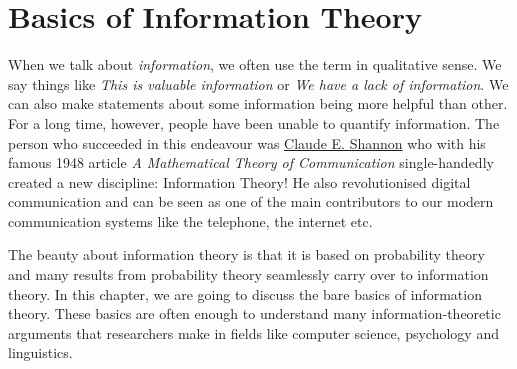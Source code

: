 \documentclass[11pt,leqno,a4paper]{report}\usepackage[]{graphicx}\usepackage[]{color}
\begin{document}


\chapter{Basics of Information Theory}

When we talk about \textit{information}, we often use the term in qualitative sense. We say things like 
\textit{This is valuable information} or 
\textit{We have a lack of information}. We can also make statements about some information being more helpful than other. For a long time, however,
people have been unable to quantify information. The person who succeeded in this endeavour was \href{https://en.wikipedia.org/wiki/Claude_Shannon}{Claude E. Shannon}
who with his famous 1948 article \textit{A Mathematical Theory of Communication} single-handedly created a new discipline: Information Theory! He also revolutionised
digital communication and can be seen as one of the main contributors to our modern communication systems like the telephone, the internet etc. 

The beauty about information theory is that it is based on probability theory and many results from probability theory seamlessly carry over to information theory.
In this chapter, we are going to discuss the bare basics of information theory. These basics are often enough to understand many information-theoretic arguments
that researchers make in fields like computer science, psychology and linguistics.
\end{document}

